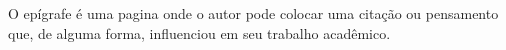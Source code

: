 \begin{epigrafe}
    \vspace*{\fill}
	\begin{flushright}
O epígrafe é uma pagina onde o autor pode colocar uma citação ou pensamento que, de alguma forma, influenciou em seu trabalho acadêmico.
	\end{flushright}
\end{epigrafe}